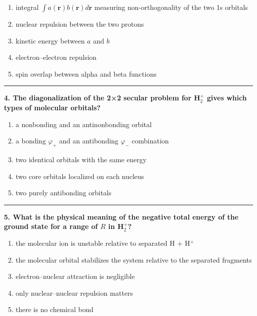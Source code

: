 \documentclass[
  english,
  9pt,
]{extbook}
\providecommand{\tightlist}{%
  \setlength{\itemsep}{0pt}\setlength{\parskip}{0pt}}
\theoremstyle{definition}
\theoremstyle{definition}
\theoremstyle{definition}
\theoremstyle{definition}
\theoremstyle{remark}
\begin{document}
\begin{enumerate}
\def\labelenumi{\alph{enumi}.}
\tightlist
\item
  integral \(\int a(\mathbf{r}) b(\mathbf{r}) d\mathbf{r}\) measuring non‑orthogonality of the two 1s orbitals
\item
  nuclear repulsion between the two protons\\
\item
  kinetic energy between \(a\) and \(b\)\\
\item
  electron--electron repulsion\\
\item
  spin overlap between alpha and beta functions
\end{enumerate}

\begin{center}\rule{0.5\linewidth}{0.5pt}\end{center}

\textbf{4. The diagonalization of the 2×2 secular problem for H\(_2^+\) gives which types of molecular orbitals?}

\begin{enumerate}
\def\labelenumi{\alph{enumi}.}
\tightlist
\item
  a nonbonding and an antinonbonding orbital\\
\item
  a bonding \(\varphi_+\) and an antibonding \(\varphi_-\) combination\\
\item
  two identical orbitals with the same energy\\
\item
  two core orbitals localized on each nucleus\\
\item
  two purely antibonding orbitals
\end{enumerate}

\begin{center}\rule{0.5\linewidth}{0.5pt}\end{center}

\textbf{5. What is the physical meaning of the negative total energy of the ground state for a range of \(R\) in H\(_2^+\)?}

\begin{enumerate}
\def\labelenumi{\alph{enumi}.}
\tightlist
\item
  the molecular ion is unstable relative to separated H + H\(^+\)\\
\item
  the molecular orbital stabilizes the system relative to the separated fragments\\
\item
  electron--nuclear attraction is negligible\\
\item
  only nuclear--nuclear repulsion matters\\
\item
  there is no chemical bond
\end{enumerate}
\end{document}
